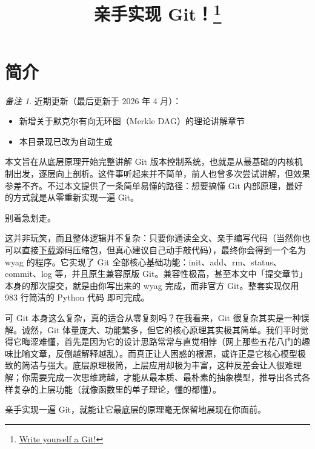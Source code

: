 \documentclass{ctexart}
\title{亲手实现 Git！\footnote{\href{https://wyag.thb.lt/}{Write yourself a Git!}}}
\author{}
\date{}
\theoremstyle{remark}
\newtheorem*{remark}{备注}
\theoremstyle{warningstyle}
\theoremstyle{warningstyle}
\begin{document}
\maketitle
\section{简介}
\begin{remark}
近期更新（最后更新于 2026 年 4 月）：
\begin{itemize}
  \item 新增关于默克尔有向无环图（Merkle DAG）的理论讲解章节
  \item 本目录现已改为自动生成
\end{itemize}
\end{remark}

本文旨在从底层原理开始完整讲解 Git 版本控制系统，也就是从最基础的内核机制出发，逐层向上剖析。这件事听起来并不简单，前人也曾多次尝试讲解，但效果参差不齐。不过本文提供了一条简单易懂的路径：想要搞懂 Git 内部原理，最好的方式就是从零重新实现一遍 Git。

别着急划走。

这并非玩笑，而且整体逻辑并不复杂：只要你通读全文、亲手编写代码（当然你也可以直接\href{https://wyag.thb.lt/wyag.zip}{下载}源码压缩包，但真心建议自己动手敲代码），最终你会得到一个名为 wyag 的程序。它实现了 Git 全部核心基础功能：init、add、rm、status、commit、log 等，并且原生兼容原版 Git。兼容性极高，甚至本文中「提交章节」本身的那次提交，就是由你写出来的 wyag 完成，而非官方 Git。整套实现仅用 983 行简洁的 Python 代码 即可完成。

可 Git 本身这么复杂，真的适合从零复刻吗？在我看来，Git 很复杂其实是一种误解。诚然，Git 体量庞大、功能繁多，但它的核心原理其实极其简单。我们平时觉得它晦涩难懂，首先是因为它的设计思路常常与直觉相悖（网上那些五花八门的趣味比喻文章，反倒越解释越乱）。而真正让人困惑的根源，或许正是它核心模型极致的简洁与强大。底层原理极简，上层应用却极为丰富，这种反差会让人很难理解；你需要完成一次思维跨越，才能从最本质、最朴素的抽象模型，推导出各式各样复杂的上层功能（就像函数里的单子理论，懂的都懂）。

亲手实现一遍 Git，就能让它最底层的原理毫无保留地展现在你面前。
\end{document}
